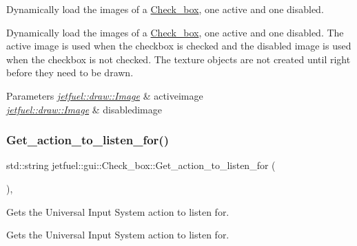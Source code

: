 Dynamically load the images of a \hyperlink{classjetfuel_1_1gui_1_1Check__box}{Check\+\_\+box}, one active and one disabled. 

Dynamically load the images of a \hyperlink{classjetfuel_1_1gui_1_1Check__box}{Check\+\_\+box}, one active and one disabled. The active image is used when the checkbox is checked and the disabled image is used when the checkbox is not checked. The texture objects are not created until right before they need to be drawn.


\begin{DoxyParams}{Parameters}
{\em \hyperlink{classjetfuel_1_1draw_1_1Image}{jetfuel\+::draw\+::\+Image}} & activeimage \\
\hline
{\em \hyperlink{classjetfuel_1_1draw_1_1Image}{jetfuel\+::draw\+::\+Image}} & disabledimage \\
\hline
\end{DoxyParams}
\mbox{\label{classjetfuel_1_1gui_1_1Check__box_a6dbbadfa0e40212fd0d133ecd2924fa8}} 
\subsubsection{\texorpdfstring{Get\+\_\+action\+\_\+to\+\_\+listen\+\_\+for()}{Get\_action\_to\_listen\_for()}}
{\footnotesize\ttfamily std\+::string jetfuel\+::gui\+::\+Check\+\_\+box\+::\+Get\+\_\+action\+\_\+to\+\_\+listen\+\_\+for (\begin{DoxyParamCaption}{ }\end{DoxyParamCaption})\hspace{0.3cm}{\ttfamily [inline]}, {\ttfamily [protected]}}



Gets the Universal Input System action to listen for. 

Gets the Universal Input System action to listen for. \mbox{\label{classjetfuel_1_1gui_1_1Check__box_a0771bcece30b82b65fad29ee66a28f27}} 
